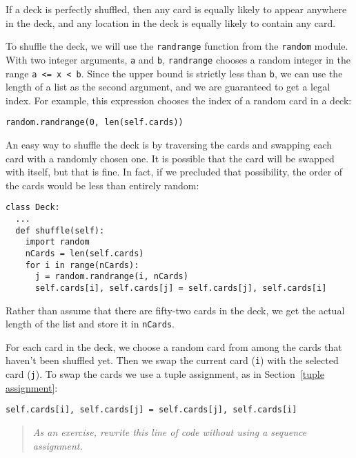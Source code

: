 If a deck is perfectly shuffled, then any card is equally likely
to appear anywhere in the deck, and any location in the deck is
equally likely to contain any card.


To shuffle the deck, we will use the {\tt randrange} function
from the {\tt random} module.  With two integer arguments,
{\tt a} and {\tt b}, {\tt randrange} chooses a random integer in
the range {\tt a <= x < b}.  Since the upper bound is strictly
less than {\tt b}, we can use the length of a list as the
second argument, and we are guaranteed to get a legal index.
For example, this expression chooses the index of a random card in a deck:

\beforeverb
\begin{verbatim}
random.randrange(0, len(self.cards))
\end{verbatim}
\afterverb
%
An easy way to shuffle the deck is by traversing the cards and
swapping each card with a randomly chosen one.  It is possible that
the card will be swapped with itself, but that is fine.  In fact, if
we precluded that possibility, the order of the cards would be less
than entirely random:

\pagebreak

\beforeverb
\begin{verbatim}
class Deck:
  ...
  def shuffle(self):
    import random
    nCards = len(self.cards)
    for i in range(nCards):
      j = random.randrange(i, nCards)
      self.cards[i], self.cards[j] = self.cards[j], self.cards[i]
\end{verbatim}
\afterverb
%
Rather than assume that there are fifty-two cards in the deck, we get
the actual length of the list and store it in {\tt nCards}.


For each card in the deck, we choose a random card from among the
cards that haven't been shuffled yet.  Then we swap the current
card ({\tt i}) with the selected card ({\tt j}).  To swap the
cards we use a tuple assignment, as in Section~\ref{tuple assignment}:

\beforeverb
\begin{verbatim}
self.cards[i], self.cards[j] = self.cards[j], self.cards[i]
\end{verbatim}
\afterverb
%
\begin{quote}
{\em As an exercise, rewrite this line of code
without using a sequence assignment.}
\end{quote}


